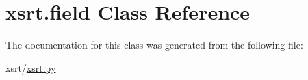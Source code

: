 \hypertarget{classxsrt_1_1field}{}\section{xsrt.\+field Class Reference}
\label{classxsrt_1_1field}


The documentation for this class was generated from the following file\+:\begin{DoxyCompactItemize}
\item 
xsrt/\hyperlink{xsrt_8py}{xsrt.\+py}\end{DoxyCompactItemize}
